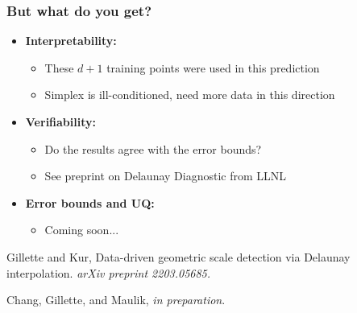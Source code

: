 \documentclass[aspectratio=169]{beamer}
\begin{document}
\begin{frame}
\frametitle{But what do you get?}

\begin{itemize}
\pause\item {\bf Interpretability:}
\begin{itemize}
\item These $d+1$ training points were used in this prediction
\item Simplex is ill-conditioned, need more data in this direction
\end{itemize}
\pause\item {\bf Verifiability:}
\begin{itemize}
\item Do the results agree with the error bounds?
\item See preprint on Delaunay Diagnostic from LLNL
\end{itemize}
\pause\item {\bf Error bounds and UQ:}
\begin{itemize}
\item Coming soon...
\end{itemize}
\end{itemize}

\vfill

{\tiny Gillette and Kur,
Data-driven geometric scale detection via Delaunay interpolation.
{\sl arXiv preprint 2203.05685.}}

{\tiny
Chang, Gillette, and Maulik, {\sl in preparation}.
}

\end{frame}
\end{document}
